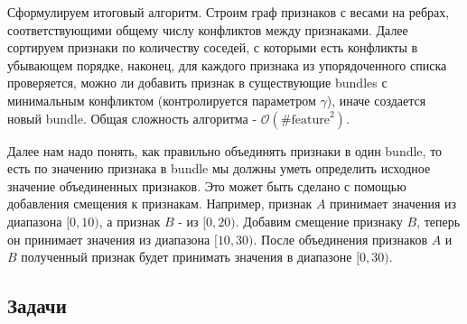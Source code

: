 Сформулируем итоговый алгоритм. Строим граф признаков с весами на ребрах, соответствующими общему числу конфликтов между признаками. Далее сортируем признаки по количеству соседей, с которыми есть конфликты в убывающем порядке, наконец, для каждого признака из упорядоченного списка проверяется, можно ли добавить признак в существующие bundles с минимальным конфликтом (контролируется параметром $\gamma$), иначе создается новый bundle. Общая сложность алгоритма - $\mathcal{O}(\#\text{feature}^2)$.

Далее нам надо понять, как правильно объединять признаки в один bundle, то есть по значению признака в bundle мы должны уметь определить исходное значение объединенных признаков. Это может быть сделано с помощью добавления смещения к признакам. Например, признак $A$ принимает значения из диапазона $[0, 10)$, а признак $B$ - из $[0, 20)$. Добавим смещение признаку $B$, теперь он принимает значения из диапазона $[10, 30)$. После объединения признаков $A$ и $B$ полученный признак будет принимать значения в диапазоне $[0, 30)$.

\subsection{Задачи}

